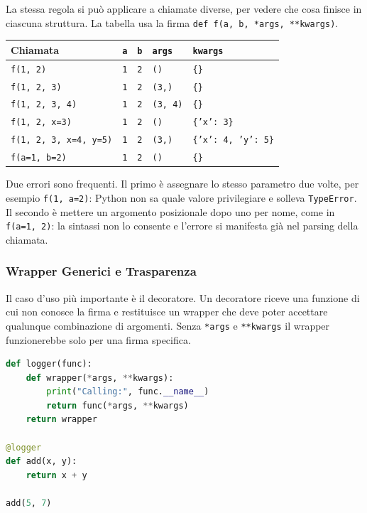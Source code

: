 \documentclass[12pt]{extarticle}
\begin{document}
\noindent La stessa regola si può applicare a chiamate diverse, per vedere che cosa finisce in ciascuna struttura. La tabella usa la firma \texttt{def f(a, b, *args, **kwargs)}.

\begin{center}
\small
\begin{tabular}{p{3.6cm}p{1.2cm}p{1.2cm}p{3.0cm}p{4.6cm}}
    \toprule
    \textbf{Chiamata} & \texttt{a} & \texttt{b} & \texttt{args} & \texttt{kwargs} \\
    \midrule
    \texttt{f(1, 2)} & \texttt{1} & \texttt{2} & \texttt{()} & \texttt{\{\}} \\
    \addlinespace
    \texttt{f(1, 2, 3)} & \texttt{1} & \texttt{2} & \texttt{(3,)} & \texttt{\{\}} \\
    \addlinespace
    \texttt{f(1, 2, 3, 4)} & \texttt{1} & \texttt{2} & \texttt{(3, 4)} & \texttt{\{\}} \\
    \addlinespace
    \texttt{f(1, 2, x=3)} & \texttt{1} & \texttt{2} & \texttt{()} & \texttt{\{'x': 3\}} \\
    \addlinespace
    \texttt{f(1, 2, 3, x=4, y=5)} & \texttt{1} & \texttt{2} & \texttt{(3,)} & \texttt{\{'x': 4, 'y': 5\}} \\
    \addlinespace
    \texttt{f(a=1, b=2)} & \texttt{1} & \texttt{2} & \texttt{()} & \texttt{\{\}} \\
    \bottomrule
\end{tabular}
\end{center}

\noindent Due errori sono frequenti. Il primo è assegnare lo stesso parametro due volte, per esempio \texttt{f(1, a=2)}: Python non sa quale valore privilegiare e solleva \texttt{TypeError}. Il secondo è mettere un argomento posizionale dopo uno per nome, come in \texttt{f(a=1, 2)}: la sintassi non lo consente e l'errore si manifesta già nel parsing della chiamata.

\subsubsection{Wrapper Generici e Trasparenza}

\noindent Il caso d'uso più importante è il decoratore. Un decoratore riceve una funzione di cui non conosce la firma e restituisce un wrapper che deve poter accettare qualunque combinazione di argomenti. Senza \texttt{*args} e \texttt{**kwargs} il wrapper funzionerebbe solo per una firma specifica.

\begin{lstlisting}[language=Python]
def logger(func):
    def wrapper(*args, **kwargs):
        print("Calling:", func.__name__)
        return func(*args, **kwargs)
    return wrapper

@logger
def add(x, y):
    return x + y

add(5, 7)
\end{lstlisting}
\end{document}
